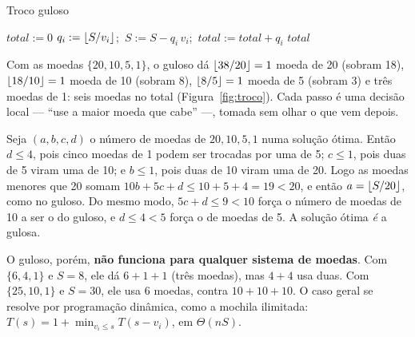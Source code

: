 \begin{pseudo}{Troco guloso}
\begin{algorithmic}
 
  \State $total:=0$
    \State $q_i:=\lfloor S/v_i\rfloor$;\ $S:=S-q_i\,v_i$;\ $total:=total+q_i$ 
  \EndFor
  \State \Return $total$ 
\EndFunction
\end{algorithmic}
\end{pseudo}

\begin{exemplo}\label{ex:troco38}
Com as moedas $\{20,10,5,1\}$, o guloso dá $\lfloor38/20\rfloor=1$ moeda de 20 (sobram 18), $\lfloor18/10\rfloor=1$ moeda de 10 (sobram 8), $\lfloor8/5\rfloor=1$ moeda de 5 (sobram 3) e três moedas de 1: seis moedas no total (Figura~\ref{fig:troco}). Cada passo é uma decisão local --- ``use a maior moeda que cabe'' ---, tomada sem olhar o que vem depois.
\begin{figura}
\end{figura}
\end{exemplo}

\begin{exemplo}\label{ex:trocootimo}
Seja $(a,b,c,d)$ o número de moedas de $20,10,5,1$ numa solução ótima. Então $d\le4$, pois cinco moedas de 1 podem ser trocadas por uma de 5; $c\le1$, pois duas de 5 viram uma de 10; e $b\le1$, pois duas de 10 viram uma de 20. Logo as moedas menores que 20 somam $10b+5c+d\le10+5+4=19<20$, e então $a=\lfloor S/20\rfloor$, como no guloso. Do mesmo modo, $5c+d\le9<10$ força o número de moedas de 10 a ser o do guloso, e $d\le4<5$ força o de moedas de 5. A solução ótima \emph{é} a gulosa.
\end{exemplo}
O guloso, porém, \textbf{não funciona para qualquer sistema de moedas}. Com $\{6,4,1\}$ e $S=8$, ele dá $6+1+1$ (três moedas), mas $4+4$ usa duas. Com $\{25,10,1\}$ e $S=30$, ele usa 6 moedas, contra $10+10+10$. O caso geral se resolve por programação dinâmica, como a mochila ilimitada: $T(s)=1+\min_{v_i\le s}T(s-v_i)$, em $\Theta(nS)$.

